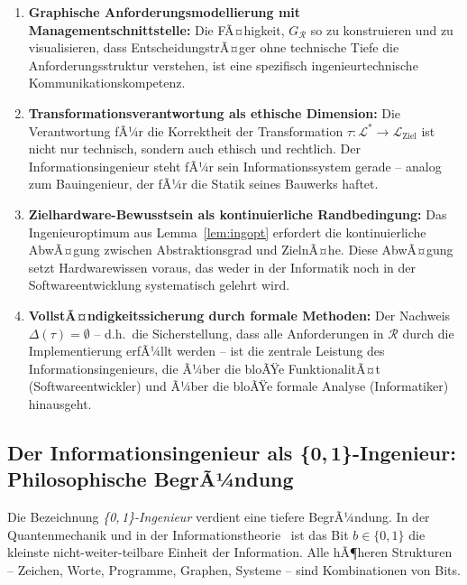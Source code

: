 ﻿\documentclass[a4paper,12pt]{report}
\theoremstyle{definition}
\begin{document}
\begin{enumerate}
  \item \textbf{Graphische Anforderungsmodellierung mit Managementschnittstelle:}
        Die FÃ¤higkeit, $G_\mathcal{R}$ so zu konstruieren und zu visualisieren, dass
        EntscheidungstrÃ¤ger ohne technische Tiefe die Anforderungsstruktur verstehen,
        ist eine spezifisch ingenieurtechnische Kommunikationskompetenz.

  \item \textbf{Transformationsverantwortung als ethische Dimension:}
        Die Verantwortung fÃ¼r die Korrektheit der Transformation
        $\tau: \mathcal{L}^* \to \mathcal{L}_{\text{Ziel}}$ ist nicht nur technisch,
        sondern auch ethisch und rechtlich. Der Informationsingenieur steht fÃ¼r sein
        Informationssystem gerade -- analog zum Bauingenieur, der fÃ¼r die Statik seines
        Bauwerks haftet.

  \item \textbf{Zielhardware-Bewusstsein als kontinuierliche Randbedingung:}
        Das Ingenieuroptimum aus Lemma~\ref{lem:ingopt} erfordert die kontinuierliche
        AbwÃ¤gung zwischen Abstraktionsgrad und ZielnÃ¤he. Diese AbwÃ¤gung setzt
        Hardwarewissen voraus, das weder in der Informatik noch in der
        Softwareentwicklung systematisch gelehrt wird.

  \item \textbf{VollstÃ¤ndigkeitssicherung durch formale Methoden:}
        Der Nachweis $\Delta(\tau) = \emptyset$ -- d.h.\ die Sicherstellung, dass alle
        Anforderungen in $\mathcal{R}$ durch die Implementierung erfÃ¼llt werden --
        ist die zentrale Leistung des Informationsingenieurs, die Ã¼ber die bloÃŸe
        FunktionalitÃ¤t (Softwareentwickler) und Ã¼ber die bloÃŸe formale Analyse
        (Informatiker) hinausgeht.
\end{enumerate}

\subsection{Der Informationsingenieur als \{0,\,1\}-Ingenieur: Philosophische BegrÃ¼ndung}

Die Bezeichnung \emph{\{0,\,1\}-Ingenieur} verdient eine tiefere BegrÃ¼ndung.
In der Quantenmechanik und in der Informationstheorie~\cite{shannon1948} ist das Bit
$b \in \{0,1\}$ die kleinste nicht-weiter-teilbare Einheit der Information. Alle
hÃ¶heren Strukturen -- Zeichen, Worte, Programme, Graphen, Systeme -- sind Kombinationen
von Bits.
\end{document}
